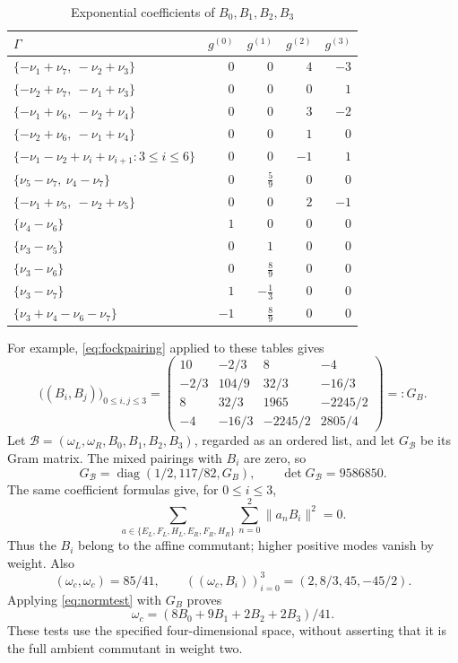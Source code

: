 \documentclass[11pt,reqno]{amsart}
\theoremstyle{definition}\newtheorem{definition}[theorem]{Definition}
\theoremstyle{remark}\newtheorem{remark}[theorem]{Remark}
\numberwithin{equation}{section}
\begin{document}
\begin{table}[!htbp]
\centering\small\renewcommand{\arraystretch}{1.15}
\caption{Exponential coefficients of $B_0,B_1,B_2,B_3$}\label{tab:Bexponential}
\begin{tabular}{@{}lrrrr@{}}\toprule
$\Gamma$ & $g^{(0)}$ & $g^{(1)}$ & $g^{(2)}$ & $g^{(3)}$\\\midrule
$\{-\nu_1+\nu_7,\ -\nu_2+\nu_3\}$ & $0$ & $0$ & $4$ & $-3$\\
$\{-\nu_2+\nu_7,\ -\nu_1+\nu_3\}$ & $0$ & $0$ & $0$ & $1$\\
$\{-\nu_1+\nu_6,\ -\nu_2+\nu_4\}$ & $0$ & $0$ & $3$ & $-2$\\
$\{-\nu_2+\nu_6,\ -\nu_1+\nu_4\}$ & $0$ & $0$ & $1$ & $0$\\
$\{-\nu_1-\nu_2+\nu_i+\nu_{i+1}:3\le i\le6\}$ & $0$ & $0$ & $-1$ & $1$\\
$\{\nu_5-\nu_7,\ \nu_4-\nu_7\}$ & $0$ & $\frac{5}{9}$ & $0$ & $0$\\
$\{-\nu_1+\nu_5,\ -\nu_2+\nu_5\}$ & $0$ & $0$ & $2$ & $-1$\\
$\{\nu_4-\nu_6\}$ & $1$ & $0$ & $0$ & $0$\\
$\{\nu_3-\nu_5\}$ & $0$ & $1$ & $0$ & $0$\\
$\{\nu_3-\nu_6\}$ & $0$ & $\frac{8}{9}$ & $0$ & $0$\\
$\{\nu_3-\nu_7\}$ & $1$ & $- \frac{1}{3}$ & $0$ & $0$\\
$\{\nu_3+\nu_4-\nu_6-\nu_7\}$ & $-1$ & $\frac{8}{9}$ & $0$ & $0$\\
\bottomrule\end{tabular}
\end{table}

For example, \eqref{eq:fockpairing} applied to these tables gives
\[
 \bigl((B_i,B_j)\bigr)_{0\le i,j\le3}=
 \begin{pmatrix}
 10&-2/3&8&-4\\
 -2/3&104/9&32/3&-16/3\\
 8&32/3&1965&-2245/2\\
 -4&-16/3&-2245/2&2805/4
 \end{pmatrix}=:G_B.
\]
Let $\mathcal B=(\omega_L,\omega_R,B_0,B_1,B_2,B_3)$, regarded as an ordered list, and let $G_{\mathcal B}$ be its Gram matrix. The mixed pairings with $B_i$ are zero, so
\begin{equation}\label{eq:invariantgram}
 G_{\mathcal B}=\operatorname{diag}(1/2,117/82,G_B),\qquad
 \det G_{\mathcal B}=9586850.
\end{equation}
The same coefficient formulas give, for $0\le i\le3$,
\[
 \sum_{a\in\{E_L,F_L,H_L,E_R,F_R,H_R\}}
 \sum_{n=0}^{2}\|a_nB_i\|^2=0.
\]
Thus the $B_i$ belong to the affine commutant; higher positive modes vanish by weight. Also
\[
 (\omega_c,\omega_c)=85/41,
 \qquad ((\omega_c,B_i))_{i=0}^3=(2,8/3,45,-45/2).
\]
Applying \eqref{eq:normtest} with $G_B$ proves
\begin{equation}\label{eq:omegaCB}
 \omega_c=(8B_0+9B_1+2B_2+2B_3)/41.
\end{equation}
These tests use the specified four-dimensional space, without asserting that it is the full ambient commutant in weight two.
\end{document}
